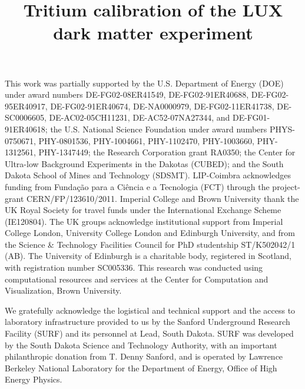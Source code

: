 \documentclass[twocolumn,superscriptaddress,prd]{revtex4-1}
\begin{document}
\title{Tritium calibration of the LUX dark matter experiment}





		\maketitle










\appendix




\begin{acknowledgments}

This work was partially supported by the U.S. Department of Energy (DOE) under award numbers DE-FG02-08ER41549, DE-FG02-91ER40688, DE-FG02-95ER40917, DE-FG02-91ER40674, DE-NA0000979, DE-FG02-11ER41738, DE-SC0006605, DE-AC02-05CH11231, DE-AC52-07NA27344, and DE-FG01-91ER40618; the U.S. National Science Foundation under award numbers PHYS-0750671, PHY-0801536, PHY-1004661, PHY-1102470, PHY-1003660, PHY-1312561, PHY-1347449; the Research Corporation grant RA0350; the Center for Ultra-low Background Experiments in the Dakotas (CUBED); and the South Dakota School of Mines and Technology (SDSMT). LIP-Coimbra acknowledges funding from Funda\c{c}\~{a}o para a Ci\^{e}ncia e a Tecnologia (FCT) through the project-grant CERN/FP/123610/2011. Imperial College and Brown University thank the UK Royal Society for travel funds under the International Exchange Scheme (IE120804). The UK groups acknowledge institutional support from Imperial College London, University College London and Edinburgh University, and from the Science \& Technology Facilities Council for PhD studentship ST/K502042/1 (AB). The University of Edinburgh is a charitable body, registered in Scotland, with registration number SC005336. This research was conducted using computational resources and services at the Center for Computation and Visualization, Brown University.

We gratefully acknowledge the logistical and technical support and the access to laboratory infrastructure provided to us by the Sanford Underground Research Facility (SURF) and its personnel at Lead, South Dakota. SURF was developed by the South Dakota Science and Technology Authority, with an important philanthropic donation from T. Denny Sanford, and is operated by Lawrence Berkeley National Laboratory for the Department of Energy, Office of High Energy Physics.

\end{acknowledgments}


\newpage
\thispagestyle{empty}
\mbox{}
\newpage
\thispagestyle{empty}
\mbox{}

%


\end{document}
